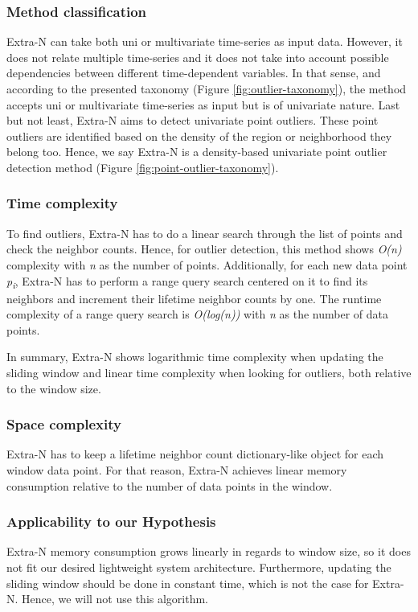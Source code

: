 \subsubsection*{Method classification}
Extra-N can take both uni or multivariate time-series as input data. However, it does not relate multiple time-series and it does not take into account possible dependencies between different time-dependent variables. In that sense, and according to the presented taxonomy (Figure \ref{fig:outlier-taxonomy}), the method accepts uni or multivariate time-series as input but is of univariate nature. Last but not least, Extra-N aims to detect univariate point outliers. These point outliers are identified based on the density of the region or neighborhood they belong too. Hence, we say Extra-N is a density-based univariate point outlier detection method (Figure \ref{fig:point-outlier-taxonomy}).

\subsubsection*{Time complexity}

To find outliers, Extra-N has to do a linear search through the list of points and check the neighbor counts. Hence, for outlier detection, this method shows \textit{O(n)} complexity with \textit{n} as the number of points. Additionally, for each new data point \textit{p\textsubscript{i}}, Extra-N has to perform a range query search centered on it to find its neighbors and increment their lifetime neighbor counts by one. The runtime complexity of a range query search is \textit{O(log(n))} \cite{range-query-log} with \textit{n} as the number of data points.

In summary, Extra-N shows logarithmic time complexity when updating the sliding window and linear time complexity when looking for outliers, both relative to the window size.


\subsubsection*{Space complexity}
Extra-N has to keep a lifetime neighbor count dictionary-like object for each window data point. For that reason, Extra-N achieves linear memory consumption relative to the number of data points in the window.

\subsubsection*{Applicability to our Hypothesis}
Extra-N memory consumption grows linearly in regards to window size, so it does not fit our desired lightweight system architecture. Furthermore, updating the sliding window should be done in constant time, which is not the case for Extra-N. Hence, we will not use this algorithm.

